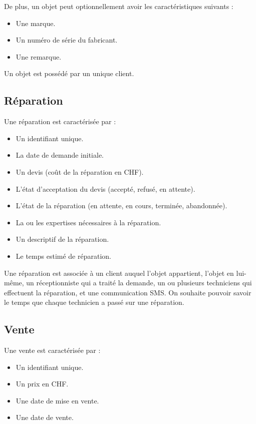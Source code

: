 \documentclass{article}
\begin{document}
De plus, un objet peut optionnellement avoir les caractéristiques suivants :
\begin{itemize}
    \item Une marque.
    \item Un numéro de série du fabricant.
    \item Une remarque.
\end{itemize}

Un objet est possédé par un unique client.

\subsection*{Réparation}
Une réparation est caractérisée par :
\begin{itemize}
    \item Un identifiant unique.
    \item La date de demande initiale.
    \item Un devis (coût de la réparation en CHF).
    \item L'état d'acceptation du devis (accepté, refusé, en attente).
    \item L'état de la réparation (en attente, en cours, terminée, abandonnée).
    \item La ou les expertises nécessaires à la réparation.
    \item Un descriptif de la réparation.
    \item Le temps estimé de réparation.
\end{itemize}

Une réparation est associée à un client auquel l'objet appartient, l'objet en lui-même, un réceptionniste qui a traité la demande, un ou plusieurs techniciens qui effectuent la réparation, et une communication SMS.
On souhaite pouvoir savoir le temps que chaque technicien a passé sur une réparation.

\subsection*{Vente}
Une vente est caractérisée par :
\begin{itemize}
    \item Un identifiant unique.
    \item Un prix en CHF.
    \item Une date de mise en vente.
    \item Une date de vente.
\end{itemize}
\end{document}
